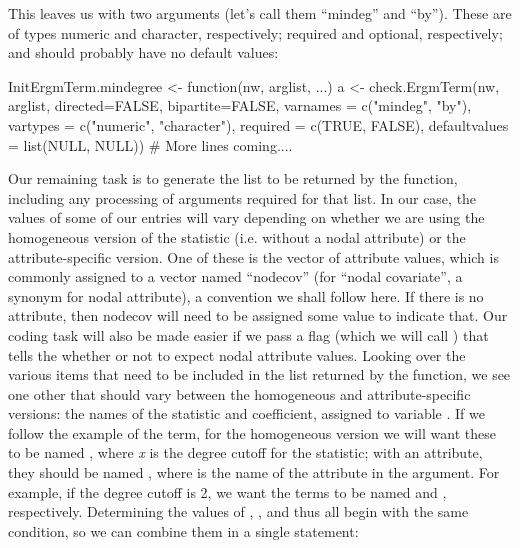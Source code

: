 \documentclass[nojss]{jss}
\begin{document}
 This leaves us with two arguments (let's call them ``mindeg'' and ``by''). These are of types numeric and character, respectively; required and optional, respectively; and should probably have no default values:

\begin{CodeChunk}
\begin{CodeInput}
InitErgmTerm.mindegree <- function(nw, arglist, ...) {
  a <- check.ErgmTerm(nw, arglist, directed=FALSE, bipartite=FALSE,
          varnames = c("mindeg", "by"),
          vartypes = c("numeric", "character"),
          required = c(TRUE, FALSE),
          defaultvalues = list(NULL, NULL))
  # More lines coming....
}
\end{CodeInput}
\end{CodeChunk}

Our remaining task is to generate the list to be returned by the function, including any processing of arguments required for that list. In our case, the values of some of our entries will vary depending on whether we are using the homogeneous version of the statistic (i.e. without a nodal attribute) or the attribute-specific version.  One of these is the vector of attribute values, which is commonly assigned to a vector named ``nodecov'' (for ``nodal covariate'', a synonym for nodal attribute), a convention we shall follow here. If there is no attribute, then nodecov will need to be assigned some value to indicate that.  Our  coding task will also be made easier if we pass a flag (which we will call ) that tells the  whether or not to expect nodal attribute values. Looking over the various items that need to be included in the list returned by the function, we see one other that should vary between the homogeneous and attribute-specific versions: the names of the statistic and coefficient, assigned to variable . If we follow the example of the  term, for the homogeneous version we will want these to be named , where {\it x} is the degree cutoff for the statistic; with an attribute, they should be named , where  is the name of the attribute in the  argument. For example, if the degree cutoff is 2, we want the terms to be named  and , respectively. Determining the values of , , and   thus all begin with the same condition, so we can combine them in a single  statement:
\end{document}
